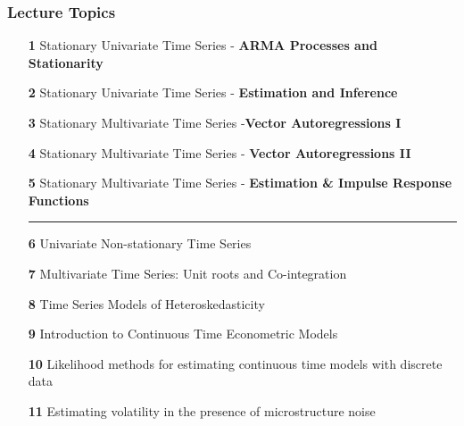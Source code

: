 \documentclass{beamer}
\begin{document}
		
		\begin{frame}
			
			\frametitle{Lecture Topics}
			\normalsize
			
			
			\begin{enumerate}
				\item[\textbf{1}] {Stationary Univariate Time Series - \textbf{ARMA Processes and Stationarity} }
				
				\item[\textbf{2}] {Stationary Univariate Time Series - \textbf{Estimation and Inference}}
				\pause
				\item[\textbf{3}] {Stationary Multivariate Time Series -\textbf{Vector Autoregressions I}}
				
				\item[\textbf{4}] {Stationary Multivariate Time Series - \textbf{Vector Autoregressions II}}
				
				\item[\textbf{5}] {Stationary Multivariate Time Series - \textbf{Estimation \& Impulse Response Functions}}
				
				\pause
				\hspace{15pt}
				\hrule
				\hspace{15pt}
				
				\item[\textbf{6}]  Univariate Non-stationary Time Series
				
				\item[\textbf{7}]  Multivariate Time Series: Unit roots and Co-integration
				
				
				
				\item[\textbf{8}] Time Series Models of Heteroskedasticity
				
				\item[\textbf{9}]  Introduction to Continuous Time Econometric Models
				
				\item[\textbf{10}]Likelihood methods for estimating continuous time models with discrete data
				
				\item[\textbf{11}]Estimating volatility in the presence of microstructure noise
				
				
			\end{enumerate}
			
			
		\end{frame}
		
		
		
\end{document}
